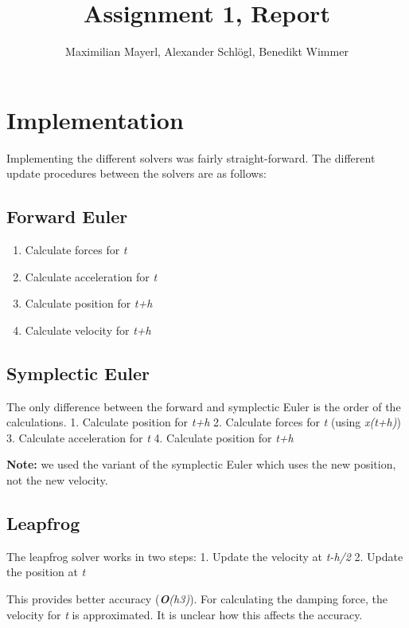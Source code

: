 \documentclass[11pt]{article}
\author{Maximilian Mayerl, Alexander Schl\"ogl, Benedikt Wimmer}
\title{Assignment 1, Report}
\begin{document}
\maketitle

    

    
\section{Implementation}\label{implementation}

Implementing the different solvers was fairly straight-forward. The
different update procedures between the solvers are as follows:

\subsection{Forward Euler}\label{forward-euler}

\begin{enumerate}
\item
  Calculate forces for \emph{t}
\item
  Calculate acceleration for \emph{t}
\item
  Calculate position for \emph{t+h}
\item
  Calculate velocity for \emph{t+h}
\end{enumerate}

\subsection{Symplectic Euler}\label{symplectic-euler}

The only difference between the forward and symplectic Euler is the
order of the calculations. 1. Calculate position for \emph{t+h} 2.
Calculate forces for \emph{t} (using \emph{x(t+h)}) 3. Calculate
acceleration for \emph{t} 4. Calculate position for \emph{t+h}

\textbf{Note:} we used the variant of the symplectic Euler which uses
the new position, not the new velocity.

\subsection{Leapfrog}\label{leapfrog}

The leapfrog solver works in two steps: 1. Update the velocity at
\emph{t-h/2} 2. Update the position at \emph{t}

This provides better accuracy (\emph{\textbf{O}(h3)}). For calculating
the damping force, the velocity for \emph{t} is approximated. It is
unclear how this affects the accuracy.
\end{document}
